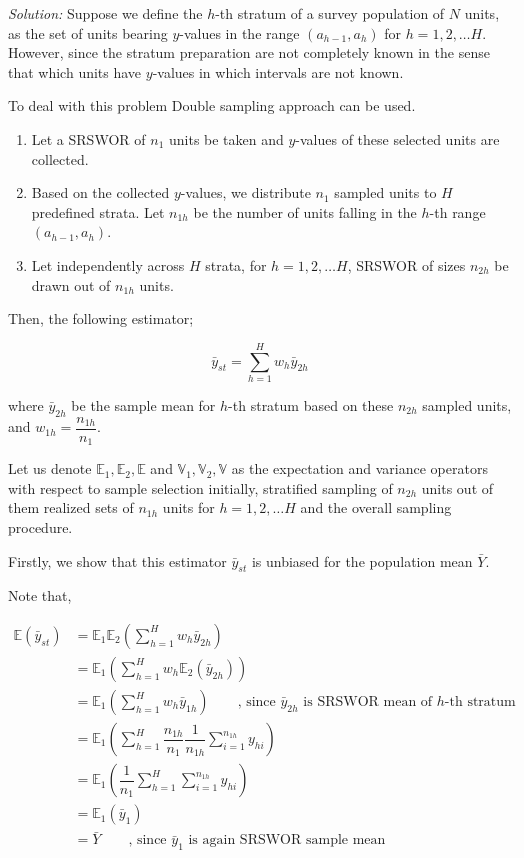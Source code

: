 \documentclass[12pt]{article}
\newcommand{\E}{\mathbb{E}}
\newcommand{\Var}{\mathbb{V}}
\theoremstyle{definition}
\newenvironment{answer}{\textit{Solution: }\quad }{ \hfill \qedsymbol}
\begin{document}
\begin{answer}
	Suppose we define the $h$-th stratum of a survey population of $N$ units, as the set of units bearing $y$-values in the range $(a_{h-1}, a_h)$ for $h = 1, 2, \dots H$. However, since the stratum preparation are not completely known in the sense that which units have $y$-values in which intervals are not known.

	To deal with this problem Double sampling approach can be used. 
	
	\begin{enumerate}
		\item Let a SRSWOR of $n_1$ units be taken and $y$-values of these selected units are collected.
		\item Based on the collected $y$-values, we distribute $n_1$ sampled units to $H$ predefined strata. Let $n_{1h}$ be the number of units falling in the $h$-th range $(a_{h-1}, a_h)$.
		\item Let independently across $H$ strata, for $h = 1, 2, \dots H$, SRSWOR of sizes $n_{2h}$ be drawn out of $n_{1h}$ units. 
	\end{enumerate}
	
	Then, the following estimator;

	$$\bar{y}_{st} = \sum_{h = 1}^{H}w_h \bar{y}_{2h}$$

	where $\bar{y}_{2h}$ be the sample mean for $h$-th stratum based on these $n_{2h}$ sampled units, and $w_{1h} = \dfrac{n_{1h}}{n_1}$.

	Let us denote $\E_1, \E_2, \E$ and $\Var_1, \Var_2, \Var$ as the expectation and variance operators with respect to sample selection initially, stratified sampling of $n_{2h}$ units out of them realized sets of $n_{1h}$ units for $h = 1, 2, \dots H$ and the overall sampling procedure.

	Firstly, we show that this estimator $\bar{y}_{st}$ is unbiased for the population mean $\bar{Y}$.

	Note that,

	\begin{align*}
		\E(\bar{y}_{st}) & = \E_1 \E_2 \left( \sum_{h = 1}^{H}w_h \bar{y}_{2h} \right)\\
		& = \E_1 \left( \sum_{h = 1}^{H} w_h \E_2 \left( \bar{y}_{2h} \right) \right)\\
		& = \E_1 \left( \sum_{h = 1}^{H} w_h \bar{y}_{1h} \right)\qquad \text{, since } \bar{y}_{2h} \text{ is SRSWOR mean of } h \text{-th stratum} \\
		& = \E_1 \left( \sum_{h = 1}^{H} \dfrac{n_{1h}}{n_1} \dfrac{1}{n_{1h}} \sum_{i = 1}^{n_{1h}} y_{hi} \right)\\
		& = \E_1 \left( \dfrac{1}{n_1} \sum_{h = 1}^{H} \sum_{i = 1}^{n_{1h}} y_{hi} \right)\\
		& = \E_1(\bar{y}_1) \\
		& = \bar{Y} \qquad \text{, since } \bar{y}_1  \text{ is again SRSWOR sample mean} \\
	\end{align*}
	

\end{answer}
\end{document}
